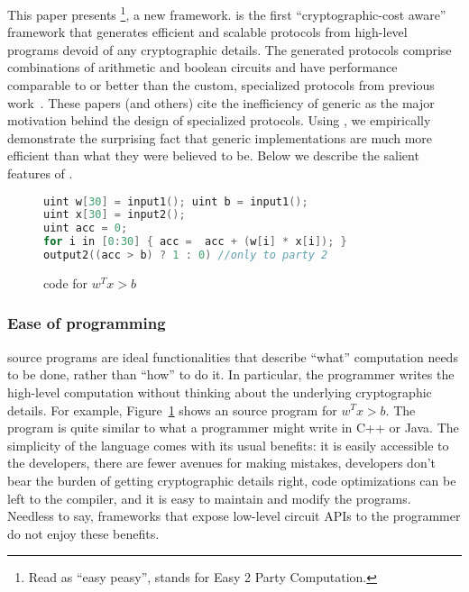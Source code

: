 This paper presents \tool\footnote{Read as ``easy peasy'',
stands for Easy 2 Party Computation.}, a new \mpc framework.
\tool is the first
``cryptographic-cost aware'' framework that generates efficient and
scalable \mpc protocols from high-level programs devoid of any
cryptographic details. The generated protocols comprise combinations
of arithmetic and boolean circuits and have performance comparable to
or better than the custom, specialized
protocols from previous work~\cite{shafindss,wu,minionn,secureml,cryptonets,valeriaMatrix}.
These papers (and others) cite the inefficiency of generic \mpc as the major motivation
behind the design of specialized protocols. Using \tool, we empirically  demonstrate
the surprising fact that generic \mpc implementations are much more efficient than what they were believed to be. 
Below we describe
the salient features of \tool.

\begin{figure}
\begin{lstlisting}[language=C]
uint w[30] = input1(); uint b = input1();
uint x[30] = input2();
uint acc = 0;
for i in [0:30] { acc =  acc + (w[i] * x[i]); }
output2((acc > b) ? 1 : 0) //only to party 2
\end{lstlisting}
\caption{\tool code for $w^Tx >b$}
\label{fig:ex-sml}
\end{figure}

\subsubsection*{Ease of programming} \tool source programs are ideal
functionalities that describe ``what'' computation needs to be done,
rather than ``how'' to do it. In particular, the programmer writes the
high-level computation without thinking about the underlying
cryptographic details. For example, Figure~\ref{fig:ex-sml}
shows an \tool source
program for $w^Tx >b$.
%
%
The program is quite similar to what a programmer might
write in C++ or Java. The simplicity of the
language comes with its usual benefits: it is easily accessible to the
developers, there are fewer avenues for making mistakes, developers
don't bear the burden of getting cryptographic details right, 
code optimizations can be left to the compiler,
and it
is easy to maintain and modify the programs. Needless to say,
frameworks that expose low-level circuit APIs to the programmer do not
enjoy these benefits.

